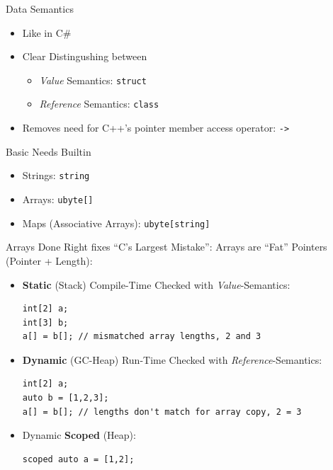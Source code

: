 \documentclass[xcolor=dvipsnames]{beamer}
\begin{document}
\begin{frame}[fragile]{Data Semantics}
  \begin{itemize}[<+->]
  \item Like in C\#
  \item Clear Distingushing between
    \begin{itemize}[<+->]
    \item \emph{Value} Semantics: \texttt{struct}
    \item \emph{Reference} Semantics: \texttt{class}
    \end{itemize}
  \item Removes need for C++'s pointer member access operator: \texttt{->}
  \end{itemize}
\end{frame}

\begin{frame}[fragile]{Basic Needs Builtin}
  \begin{itemize}[<+->]
  \item Strings: \texttt{string}
  \item Arrays: \texttt{ubyte[]}
  \item Maps (Associative Arrays): \texttt{ubyte[string]}
  \end{itemize}
\end{frame}

\begin{frame}[fragile]{Arrays Done Right fixes ``C's Largest Mistake'': }
  Arrays are ``Fat'' Pointers (Pointer + Length):
\pause
  \begin{itemize}[<+->]
  \item \textbf{Static} (Stack) Compile-Time Checked with \textit{Value}-Semantics:\\
    \begin{lstlisting}[frame=single]
int[2] a;
int[3] b;
a[] = b[]; // mismatched array lengths, 2 and 3
    \end{lstlisting}
  \item \textbf{Dynamic} (GC-Heap) Run-Time Checked with \textit{Reference}-Semantics:\\
    \begin{lstlisting}[frame=single]
int[2] a;
auto b = [1,2,3];
a[] = b[]; // lengths don't match for array copy, 2 = 3
    \end{lstlisting}
  \item Dynamic \textbf{Scoped} (Heap):\\
    \begin{lstlisting}[frame=single]
scoped auto a = [1,2];
    \end{lstlisting}
\end{itemize}
\end{frame}
\end{document}
